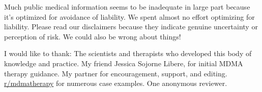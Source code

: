 \documentclass[12pt,letterpaper]{book}
\begin{document}
Much public medical information seems to be inadequate in large part because it’s optimized for avoidance of liability. We spent almost no effort optimizing for liability. Please read our disclaimers because they indicate genuine uncertainty or perception of risk. We could also be wrong about things!




I would like to thank: The scientists and therapists who developed this body of knowledge and practice. My friend Jessica Sojorne Libere, for initial MDMA therapy guidance. My partner for encouragement, support, and editing. \href{https://www.reddit.com/r/mdmatherapy}{r/mdmatherapy} for numerous case examples. One anonymous reviewer.
\end{document}
